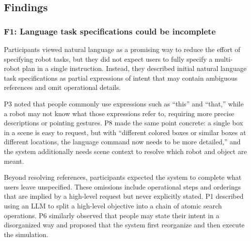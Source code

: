 

\subsection{Findings}

\subsubsection{F1: Language task specifications could be incomplete}

Participants viewed natural language as a promising way to reduce the effort of specifying robot tasks, but they did not expect users to fully specify a multi-robot plan in a single instruction.
Instead, they described initial natural language task specifications as partial expressions of intent that may contain ambiguous references and omit operational details.

P3 noted that people commonly use expressions such as ``this'' and ``that,'' while a robot may not know what those expressions refer to, requiring more precise descriptions or pointing gestures.
P8 made the same point concrete: a single box in a scene is easy to request, but with ``different colored boxes or similar boxes at different locations, the language command now needs to be more detailed,'' and the system additionally needs scene context to resolve which robot and object are meant.

Beyond resolving references, participants expected the system to complete what users leave unspecified.
These omissions include operational steps and orderings that are implied by a high-level request but never explicitly stated.
P1 described using an LLM to split a high-level objective into a chain of atomic search operations.
P6 similarly observed that people may state their intent in a disorganized way and proposed that the system first reorganize and then execute the simulation.

